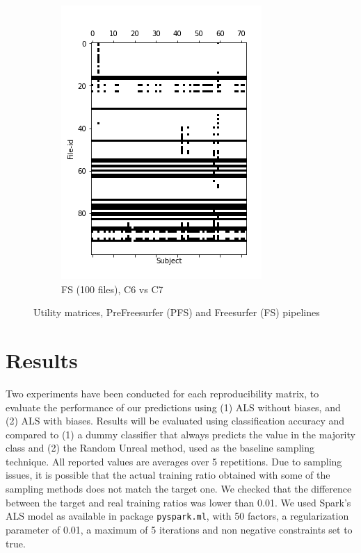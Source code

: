 \documentclass[10pt, conference, compsocconf]{IEEEtran}
\begin{document}
\begin{figure}[h!]
\begin{subfigure}[b]{0.45\columnwidth}
        \includegraphics[width=\columnwidth]{data/Utility_Matrix/FS-100files/FS-First-bound-100files.png}
  \caption{FS (100 files), C6 vs C7}
  \end{subfigure}
  \caption{Utility matrices, PreFreesurfer (PFS) and Freesurfer (FS) pipelines}
    \label{fig:utility-matrices}
\end{figure}

\section{Results}

\label{sec:results}

Two experiments have been conducted for each reproducibility matrix, to evaluate the performance of our 
predictions using (1) ALS without biases, and (2) ALS with biases. 
Results will be evaluated using classification accuracy and compared to (1) a dummy classifier that always 
predicts the value in the majority class and (2) the Random Unreal 
method, used as the baseline sampling technique. All reported values are averages
over 5 repetitions. Due to sampling issues, it is possible that the actual 
training ratio obtained with some of the sampling methods does not 
match the target one. We checked that the difference between the target 
and real training ratios was lower than 0.01. We used Spark's ALS model 
as available in package \texttt{pyspark.ml}, with 50 factors, a 
regularization parameter of 0.01, a maximum of 5 iterations and non 
negative constraints set to true.
\end{document}
